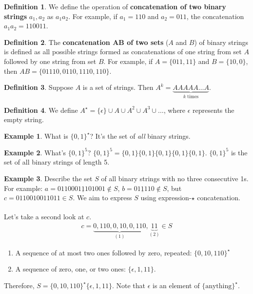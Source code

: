 \documentclass[]{article}
\theoremstyle{definition}
\newtheorem*{defn}{Definition}
\newtheorem{ex}{Example}[section]
\begin{document}
		\begin{defn}
			We define the operation of \textbf{concatenation of two binary strings} $a_1, a_2$ as $a_1 a_2$. For example, if $a_1 = 110$ and $a_2 = 011$, the concatenation $a_1 a_2 = 110011$.
		\end{defn}

		\begin{defn}
			The \textbf{concatenation $\boldsymbol{AB}$ of two sets} ($A$ and $B$) of binary strings is defined as all possible strings formed as concatenations of one string from set $A$ followed by one string from set $B$. For example, if $A = \{ 011, 11 \}$ and $B = \{10, 0\}$, then $AB = \{ 01110, 0110, 1110, 110 \}$.
		\end{defn}

		\begin{defn}
			Suppose $A$ is a set of strings. Then $A^k = \underbrace{AAAAA \ldots A}_{k \text{ times}}$.
		\end{defn}

		\begin{defn}
			We define $A^\star = \{ \epsilon \} \cup A \cup A^2 \cup A^3 \cup \ldots$, where $\epsilon$ represents the empty string.
		\end{defn}

		\begin{ex}
			What is $\{ 0, 1 \}^\star$? It's the set of \emph{all} binary strings.
		\end{ex}

		\begin{ex}
			What's $\{ 0, 1 \}^5$? $\{ 0, 1 \}^5 = \{ 0, 1 \} \{ 0, 1 \} \{ 0, 1 \} \{ 0, 1 \} \{ 0, 1 \}$. $\{0, 1\}^5$ is the set of all binary strings of length 5.
		\end{ex}

		\begin{ex}
			Describe the set $S$ of all binary strings with no three consecutive 1s. For example: $a = 011000\underline{111}01001 \not \in S$, $b = 0\underline{111}10 \not \in S$, but $c = 0110010011011 \in S$. We aim to express $S$ using expression-$\star$ concatenation.
			\\ \\
			Let's take a second look at $c$.
			\begin{align*}
				c = \underbrace{0,110,0,10,0,110}_{(1)},\underbrace{11}_{(2)} \in S
			\end{align*}
			
			\begin{enumerate}
				\item A sequence of at most two ones followed by zero, repeated: $\{ 0, 10, 110 \}^\star$
				\item A sequence of zero, one, or two ones: $\{ \epsilon, 1, 11 \}$.
			\end{enumerate}

			Therefore, $S = \{0, 10, 110\}^\star \{ \epsilon, 1, 11 \}$. Note that $\epsilon$ is an element of $\{ \text{anything} \}^\star$.
		\end{ex}
\end{document}

